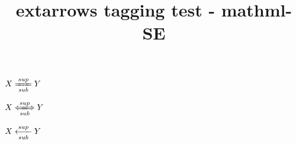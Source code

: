 \documentclass{article}
\title{extarrows tagging test - mathml-SE}
\begin{document}
$X\xlongequal[sub]{sup}Y$

$X\xLongleftrightarrow[sub]{sup}Y$

$X\xlongleftarrow[sub]{sup}Y$
\end{document}
